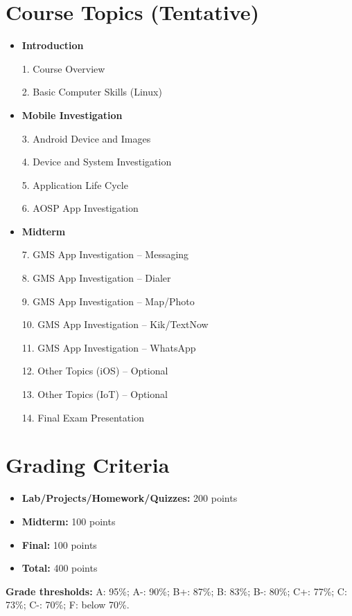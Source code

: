 \documentclass[10pt]{article}
\begin{document}
\section{Course Topics (Tentative)}
\begin{itemize}[leftmargin=1.8em,label={},itemsep=0pt,topsep=0pt,parsep=0pt,partopsep=0pt]
  \item \textbf{Introduction}
  \item[1.] Course Overview
  \item[2.] Basic Computer Skills (Linux)
  \item \textbf{Mobile Investigation}
  \item[3.] Android Device and Images
  \item[4.] Device and System Investigation
  \item[5.] Application Life Cycle
  \item[6.] AOSP App Investigation
  \item \textbf{Midterm}
  \item[7.] GMS App Investigation -- Messaging
  \item[8.] GMS App Investigation -- Dialer
  \item[9.] GMS App Investigation -- Map/Photo
  \item[10.] GMS App Investigation -- Kik/TextNow
  \item[11.] GMS App Investigation -- WhatsApp
  \item[12.] Other Topics (iOS) -- Optional
  \item[13.] Other Topics (IoT) -- Optional
  \item[14.] Final Exam Presentation
\end{itemize}

\section{Grading Criteria}
\begin{itemize}[label={},leftmargin=0pt,itemsep=0.1em]
  \item \textbf{Lab/Projects/Homework/Quizzes:} 200 points
  \item \textbf{Midterm:} 100 points
  \item \textbf{Final:} 100 points
  \item \textbf{Total:} 400 points
\end{itemize}

\textbf{Grade thresholds:} A: 95\%; A-: 90\%; B+: 87\%; B: 83\%; B-: 80\%; C+: 77\%; C: 73\%; C-: 70\%; F: below 70\%.
\end{document}
